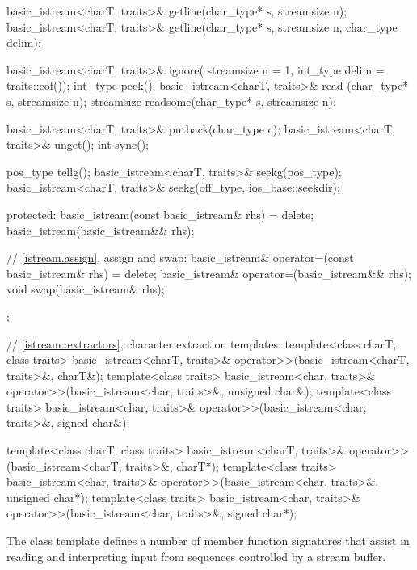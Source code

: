 \begin{codeblock}
{{    basic_istream<charT, traits>& getline(char_type* s, streamsize n);
    basic_istream<charT, traits>& getline(char_type* s, streamsize n,
                                          char_type delim);

    basic_istream<charT, traits>& ignore(
      streamsize n = 1, int_type delim = traits::eof());
    int_type                      peek();
    basic_istream<charT, traits>& read    (char_type* s, streamsize n);
    streamsize                    readsome(char_type* s, streamsize n);

    basic_istream<charT, traits>& putback(char_type c);
    basic_istream<charT, traits>& unget();
    int sync();

    pos_type tellg();
    basic_istream<charT, traits>& seekg(pos_type);
    basic_istream<charT, traits>& seekg(off_type, ios_base::seekdir);

  protected:
    basic_istream(const basic_istream& rhs) = delete;
    basic_istream(basic_istream&& rhs);

    // \ref{istream.assign}, assign and swap:
    basic_istream& operator=(const basic_istream& rhs) = delete;
    basic_istream& operator=(basic_istream&& rhs);
    void swap(basic_istream& rhs);
  };

  // \ref{istream::extractors}, character extraction templates:
  template<class charT, class traits>
    basic_istream<charT, traits>& operator>>(basic_istream<charT, traits>&,
                                             charT&);
  template<class traits>
    basic_istream<char, traits>& operator>>(basic_istream<char, traits>&,
                                            unsigned char&);
  template<class traits>
    basic_istream<char, traits>& operator>>(basic_istream<char, traits>&,
                                            signed char&);

  template<class charT, class traits>
    basic_istream<charT, traits>& operator>>(basic_istream<charT, traits>&,
                                             charT*);
  template<class traits>
    basic_istream<char, traits>& operator>>(basic_istream<char, traits>&,
                                            unsigned char*);
  template<class traits>
    basic_istream<char, traits>& operator>>(basic_istream<char, traits>&,
                                            signed char*);
}
\end{codeblock}

\pnum
The class template
defines a number of member function
signatures that assist in reading and interpreting input from sequences
controlled by a stream buffer.

